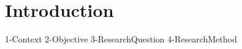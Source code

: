 \chapter{Introduction}
    \ifpdf
        \graphicspath{{2-MainMatter/1_introduction/figures/PNG/}{2-MainMatter/1_introduction/figures/PDF/}{2-MainMatter/1_introduction/figures/}}
    \else
        \graphicspath{{2-MainMatter/1_introduction/figures/EPS/}{2-MainMatter/1_introduction/figures/}}
    \fi

    {1-Context}
    {2-Objective}
    {3-ResearchQuestion}
    {4-ResearchMethod}